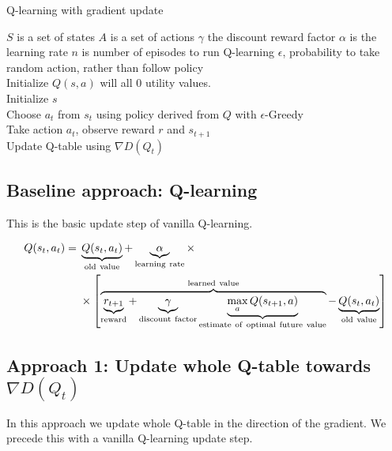 \begin{algorithm}[H]
\caption{Q-learning with gradient update}
\begin{algorithmic}[1]
\Require
 	\State $S$ is a set of states
 	\State $A$ is a set of actions
 	\State $\gamma$ the discount reward factor
 	\State $\alpha$ is the learning rate
 	\State $n$ is number of episodes to run Q-learning
 	\State $\epsilon$, probability to take random action, rather than follow policy
 {}
\\Initialize $Q(s,a)$ will all 0 utility values.
\\ \qquad Initialize $s$
\\ \qquad \qquad Choose $a_t$ from $s_t$ using policy derived from $Q$ with $\epsilon$-Greedy
\\ \qquad \qquad Take action $a_t$, observe reward $r$ and $s_{t+1}$
\\ \qquad \qquad Update Q-table using $\nabla D(Q_{t})$
\EndFor
\EndFor
\EndProcedure
\end{algorithmic}
\end{algorithm}

\subsection{Baseline approach: Q-learning}
This is the basic update step of vanilla Q-learning.

\begin{equation} \label{eq:QlearningUpdate}
\begin{aligned}
  Q(s_{t},a_{t}) ={} & \underbrace{Q(s_t,a_t)}_{\rm old~value} +
  \underbrace{\alpha}_{\rm learning~rate} \times \\
   & \times \left[
    \overbrace{\underbrace{r_{t+1}}_{\rm reward} + \underbrace{\gamma}_{\rm
        discount~factor} \underbrace{\max_{a}Q(s_{t+1}, a)}_{\rm
        estimate~of~optimal~future~value}}^{\rm learned~value} -
    \underbrace{Q(s_t,a_t)}_{\rm old~value} \right]
\end{aligned}
\end{equation}

\subsection{Approach 1: Update whole Q-table towards $\nabla D(Q_{t})$}
In this approach we update whole Q-table in the direction of the gradient. We precede this with a vanilla Q-learning update step.

